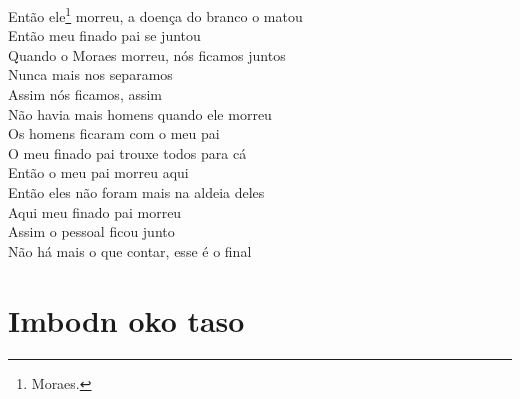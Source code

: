 \begin{linenumbers}\begingroup\raggedright
 
\noindent   Então ele\footnote{Moraes.} morreu, a doença do branco o matou\\
  Então meu finado pai se juntou\\
  Quando o Moraes morreu, nós ficamos juntos\\
  Nunca mais nos separamos\\
  Assim nós ficamos, assim\\
  Não havia mais homens quando ele morreu\\
  Os homens ficaram com o meu pai\\
  O meu finado pai trouxe todos para cá\\
  Então o meu pai morreu aqui\\
  Então eles não foram mais na aldeia deles\\
  Aqui meu finado pai morreu\\
  Assim o pessoal ficou junto\\
  Não há mais o que contar, esse é o final
\end{linenumbers}\endgroup

\chapter{Imbodn oko taso}

